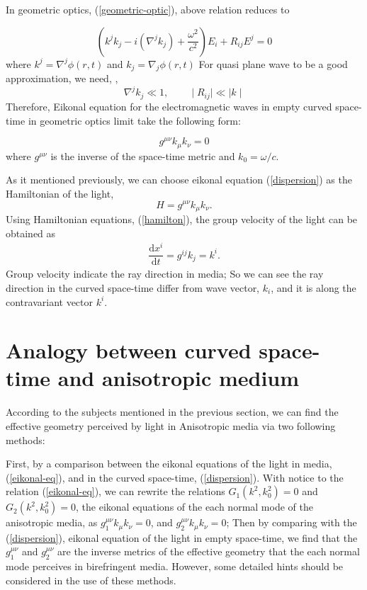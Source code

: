 \documentclass[9pt,twocolumn,twoside]{osajnl}
\begin{document}
In geometric optics, (\ref{geometric-optic}), above relation reduces to

\begin{equation}
\left(k^{j}k_{j}-i(\nabla^{j}k_{j})+ \dfrac{\omega^2}{c^2} \right) E_{i}+R_{ij}E^{j}=0
\end{equation}
where $k^{j}=\nabla^{j}{\phi(r,t)}$ and $k_{j}=\nabla_{j}{\phi(r,t)}$
For quasi plane wave to be a good approximation, we need, \cite{leonhardt2012geometry},
\begin{equation}
\nabla^{j}k_{j}\ll 1, \qquad  \mid{R_{ij}}\mid \ll \mid{k}\mid
\end{equation}
Therefore, Eikonal equation for the electromagnetic waves in empty curved space-time in geometric optics limit take the following form:
 
\begin{equation}\label{dispersion}
g^{\mu\nu}k_{\mu}k_{\nu}=0
\end{equation}
where $g^{\mu\nu}$ is the inverse of the space-time metric and $k_{0}={\omega}/{c}$.

As it mentioned  previously, we can choose eikonal equation (\ref{dispersion}) as the Hamiltonian of the light,
\begin{equation}
H=g^{\mu\nu}k_{\mu}k_{\nu}.
\end{equation}
Using Hamiltonian equations, (\ref{hamilton}), the group velocity of the light can be obtained as
\begin{eqnarray}\label{group}
\dfrac{\mathrm{d}x^{i}}{\mathrm{d}t}=g^{ij}k_{j}=k^{i}.
\end{eqnarray}
Group velocity indicate the ray direction in media; So we can see the ray direction in the curved space-time differ from wave vector, $k_{i}$, and it is along the contravariant vector $k^{i}$.

 \section{Analogy between curved space-time and anisotropic medium}
 
According to the subjects mentioned in the previous section, we can find  the effective geometry perceived by light in Anisotropic media via two following methods:

First, by a comparison between the eikonal equations of the light in media, (\ref{eikonal-eq}), and in the curved space-time, (\ref{dispersion}). With notice to the relation (\ref{eikonal-eq}), we can rewrite the relations $G_{1}(k^2,k^2_{0})=0$ and $G_{2}(k^2,k^2_{0})=0 $, the eikonal equations of the each normal mode of the anisotropic media, as $g_{1}^{\mu\nu}k_{\mu}k_{\nu}=0$, and $g_{2}^{\mu\nu}k_{\mu}k_{\nu}=0$; Then by comparing with the (\ref{dispersion}), eikonal equation of the light in empty space-time, we find that the $g_{1}^{\mu\nu}$  and $g_{2}^{\mu\nu}$  are the inverse metrics of the effective geometry that the each normal mode perceives in birefringent media.  
However, some detailed hints should be considered in the use of these methods.
\end{document}

